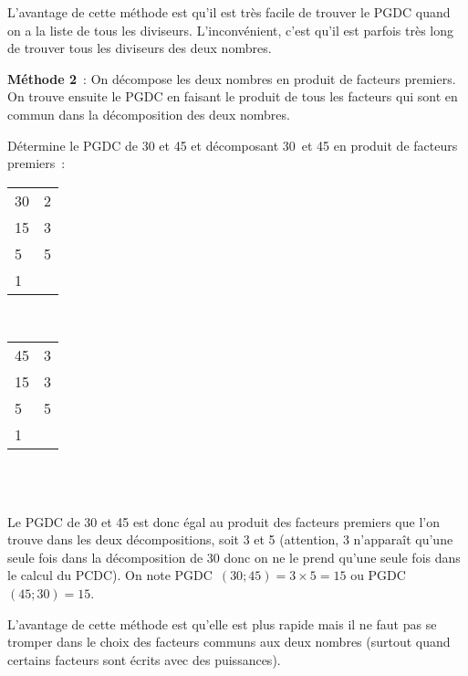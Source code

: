 \begin{methode*1}
 \begin{remarque}
L'avantage de cette méthode est qu'il est très facile de trouver le PGDC quand on a la liste de tous les diviseurs. L'inconvénient, c'est qu'il est parfois très long de trouver tous les diviseurs des deux nombres.
\end{remarque}

\vspace{0.5cm}

\textcolor{H1}{\textbf{Méthode 2}} : On décompose les deux nombres en produit de facteurs premiers. On trouve ensuite le PGDC en faisant le produit de tous les facteurs qui sont en commun dans la décomposition des deux nombres.

\begin{exemple*1}
Détermine le PGDC de 30 et 45 et décomposant 30 et 45 en produit de facteurs premiers : \\[1em]
\begin{minipage}[t]{0.26\textwidth}
 \begin{tabularx}{0.3\textwidth}{X|X}
 30 & 2 \\ 
 15 & 3 \\
 5 & 5 \\
 1 & \\ 
 \end{tabularx} \\[1em]
\end{minipage} \hfill%
\begin{minipage}[t]{0.56\textwidth}
 \begin{tabularx}{0.3\textwidth}{X|X}
 45 & 3 \\ 
 15 & 3 \\
 5 & 5 \\
 1 & \\ 
 \end{tabularx} \\[1em]
 \end{minipage} \\
Le PGDC de 30 et 45 est donc égal au produit des facteurs premiers que l'on trouve dans les deux décompositions, soit 3 et 5 (attention, 3 n’apparaît qu'une seule fois dans la décomposition de 30 donc on ne le prend qu'une seule fois dans le calcul du PCDC).
On note PGDC $(30 ; 45) = 3 \times 5 = 15$ ou PGDC $(45 ; 30) = 15$. \\[-2em]
 \end{exemple*1}

 \begin{remarque}
L'avantage de cette méthode est qu'elle est plus rapide mais il ne faut pas se tromper dans le choix des facteurs communs aux deux nombres (surtout quand certains facteurs sont écrits avec des puissances).
\end{remarque}


\end{methode*1}
